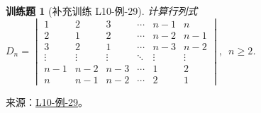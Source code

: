 \documentclass[12pt,fontset=fandol]{ctexart}
\newtheorem{exercise}{训练题}[section]
\begin{document}
\begin{exercise}[补充训练 L10-例-29]\label{prob:L10-例-29}
计算行列式$D_n=\begin{vmatrix}
            1      & 2      & 3      & \cdots & n-1    & n      \\
            2      & 1      & 2      & \cdots & n-2    & n-1    \\
            3      & 2      & 1      & \cdots & n-3    & n-2    \\
            \vdots & \vdots & \vdots & \ddots & \vdots & \vdots \\
            n-1    & n-2    & n-3    & \cdots & 1      & 2      \\
            n      & n-1    & n-2    & \cdots & 2      & 1
        \end{vmatrix},\enspace n \geqslant 2$.
\end{exercise}
\noindent 来源：\href{https://github.com/yhwu-is/Linear-Algebra-Left-Undone/blob/new/%E8%AE%B2%E4%B9%89/%E4%B8%93%E9%A2%98/10%20%E8%A1%8C%E5%88%97%E5%BC%8F.tex}{L10-例-29}。
\end{document}
